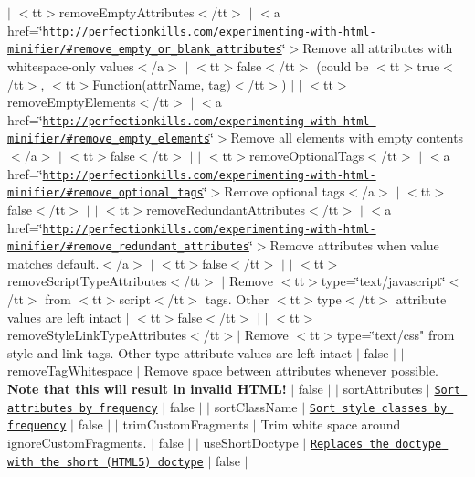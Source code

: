 $\vert$ $<$tt$>$remove\+Empty\+Attributes$<$/tt$>$        $\vert$ $<$a href=\char`\"{}\href{http://perfectionkills.com/experimenting-with-html-minifier/#remove_empty_or_blank_attributes}{\tt http\+://perfectionkills.\+com/experimenting-\/with-\/html-\/minifier/\#remove\+\_\+empty\+\_\+or\+\_\+blank\+\_\+attributes}\char`\"{}$>$\+Remove all attributes with whitespace-\/only values$<$/a$>$ $\vert$ $<$tt$>$false$<$/tt$>$ (could be $<$tt$>$true$<$/tt$>$, $<$tt$>$\+Function(attr\+Name, tag)$<$/tt$>$) $\vert$
$\vert$ $<$tt$>$remove\+Empty\+Elements$<$/tt$>$          $\vert$ $<$a href=\char`\"{}\href{http://perfectionkills.com/experimenting-with-html-minifier/#remove_empty_elements}{\tt http\+://perfectionkills.\+com/experimenting-\/with-\/html-\/minifier/\#remove\+\_\+empty\+\_\+elements}\char`\"{}$>$\+Remove all elements with empty contents$<$/a$>$ $\vert$ $<$tt$>$false$<$/tt$>$ $\vert$
$\vert$ $<$tt$>$remove\+Optional\+Tags$<$/tt$>$           $\vert$ $<$a href=\char`\"{}\href{http://perfectionkills.com/experimenting-with-html-minifier/#remove_optional_tags}{\tt http\+://perfectionkills.\+com/experimenting-\/with-\/html-\/minifier/\#remove\+\_\+optional\+\_\+tags}\char`\"{}$>$\+Remove optional tags$<$/a$>$ $\vert$ $<$tt$>$false$<$/tt$>$ $\vert$
$\vert$ $<$tt$>$remove\+Redundant\+Attributes$<$/tt$>$    $\vert$ $<$a href=\char`\"{}\href{http://perfectionkills.com/experimenting-with-html-minifier/#remove_redundant_attributes}{\tt http\+://perfectionkills.\+com/experimenting-\/with-\/html-\/minifier/\#remove\+\_\+redundant\+\_\+attributes}\char`\"{}$>$\+Remove attributes when value matches default.$<$/a$>$ $\vert$ $<$tt$>$false$<$/tt$>$ $\vert$
$\vert$ $<$tt$>$remove\+Script\+Type\+Attributes$<$/tt$>$   $\vert$ Remove $<$tt$>$type=\char`\"{}text/javascript\char`\"{}$<$/tt$>$ from $<$tt$>$script$<$/tt$>$ tags. Other $<$tt$>$type$<$/tt$>$ attribute values are left intact $\vert$ $<$tt$>$false$<$/tt$>$ $\vert$
$\vert$ $<$tt$>$remove\+Style\+Link\+Type\+Attributes$<$/tt$>$$\vert$ Remove $<$tt$>$type=\char`\"{}text/css" from {\ttfamily style} and {\ttfamily link} tags. Other {\ttfamily type} attribute values are left intact $\vert$ {\ttfamily false} $\vert$ $\vert$ {\ttfamily remove\+Tag\+Whitespace} $\vert$ Remove space between attributes whenever possible. {\bfseries Note that this will result in invalid H\+T\+M\+L!} $\vert$ {\ttfamily false} $\vert$ $\vert$ {\ttfamily sort\+Attributes} $\vert$ \href{#sorting-attributes--style-classes}{\tt Sort attributes by frequency} $\vert$ {\ttfamily false} $\vert$ $\vert$ {\ttfamily sort\+Class\+Name} $\vert$ \href{#sorting-attributes--style-classes}{\tt Sort style classes by frequency} $\vert$ {\ttfamily false} $\vert$ $\vert$ {\ttfamily trim\+Custom\+Fragments} $\vert$ Trim white space around {\ttfamily ignore\+Custom\+Fragments}. $\vert$ {\ttfamily false} $\vert$ $\vert$ {\ttfamily use\+Short\+Doctype} $\vert$ \href{http://perfectionkills.com/experimenting-with-html-minifier/#use_short_doctype}{\tt Replaces the {\ttfamily doctype} with the short (H\+T\+M\+L5) doctype} $\vert$ {\ttfamily false} $\vert$

